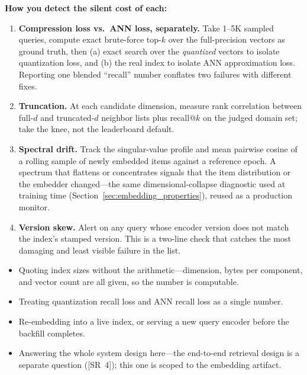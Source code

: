 \begin{interviewq}
\textbf{How you detect the silent cost of each:}
\begin{enumerate}
    \item \textbf{Compression loss vs.\ ANN loss, separately.} Take 1--5K sampled queries, compute exact brute-force top-$k$ over the full-precision vectors as ground truth, then (a) exact search over the \emph{quantized} vectors to isolate quantization loss, and (b) the real index to isolate ANN approximation loss. Reporting one blended ``recall'' number conflates two failures with different fixes.
    \item \textbf{Truncation.} At each candidate dimension, measure rank correlation between full-$d$ and truncated-$d$ neighbor lists plus recall@$k$ on the judged domain set; take the knee, not the leaderboard default.
    \item \textbf{Spectral drift.} Track the singular-value profile and mean pairwise cosine of a rolling sample of newly embedded items against a reference epoch. A spectrum that flattens or concentrates signals that the item distribution or the embedder changed---the same dimensional-collapse diagnostic used at training time (Section~\ref{sec:embedding_properties}), reused as a production monitor.
    \item \textbf{Version skew.} Alert on any query whose encoder version does not match the index's stamped version. This is a two-line check that catches the most damaging and least visible failure in the list.
\end{enumerate}

\redflags
\begin{itemize}
    \item Quoting index sizes without the arithmetic---dimension, bytes per component, and vector count are all given, so the number is computable.
    \item Treating quantization recall loss and ANN recall loss as a single number.
    \item Re-embedding into a live index, or serving a new query encoder before the backfill completes.
    \item Answering the whole system design here---the end-to-end retrieval design is a separate question ([SR~4]); this one is scoped to the embedding artifact.
\end{itemize}



\end{interviewq}
